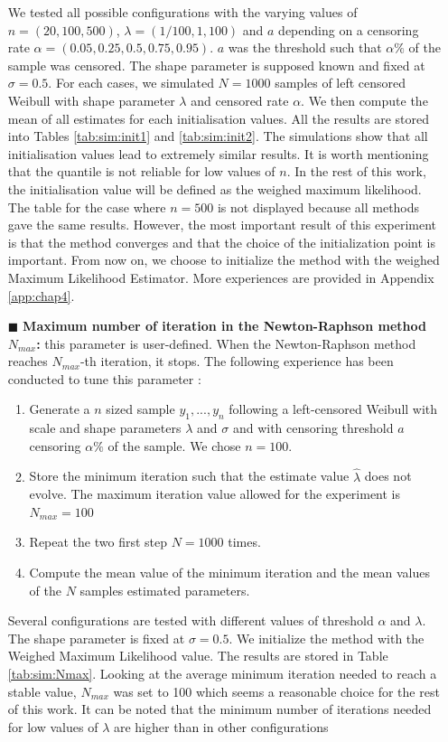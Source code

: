 \begin{itemize}
     We tested all possible configurations with the varying values of $n = (20,100,500)$, $\lambda = (1/100,1,100)$ and $a$ depending on a censoring rate $\alpha = (0.05,0.25,0.5,0.75,0.95)$. $a$ was the threshold such that $\alpha \%$ of the sample was censored. The shape parameter is supposed known and fixed at $\sigma = 0.5$. For each cases, we simulated $N = 1000$ samples of left censored Weibull with shape parameter $\lambda$ and censored rate $\alpha$. We then compute the mean of all estimates for each initialisation values. All the results are stored into Tables \ref{tab:sim:init1} and \ref{tab:sim:init2}. The simulations show that all initialisation values lead to extremely similar results. It is worth mentioning that the quantile is not reliable for low values of $n$. In the rest of this work, the initialisation value will be defined as the weighed maximum likelihood. The table for the case where $n = 500$ is not displayed because all methods gave the same results. However, the most important result of this experiment is that the method converges and that the choice of the initialization point is important. From now on, we choose to initialize the method with the weighed Maximum Likelihood Estimator. More experiences are provided in Appendix \ref{app:chap4}.
     \item[$\blacksquare$] \textbf{Maximum number of iteration in the Newton-Raphson method $N_{max}$:} this parameter is user-defined. When the Newton-Raphson method reaches $N_{max}$-th iteration, it stops. The following experience has been conducted to tune this parameter : 
    \begin{enumerate}
        \item Generate a $n$ sized sample $y_1,...,y_n$ following a left-censored Weibull with scale and shape parameters $\lambda$ and $\sigma$ and with censoring threshold $a$ censoring $\alpha \%$ of the sample. We chose $n=100$.
        \item Store the minimum iteration such that the estimate value $\hat\lambda$ does not evolve. The maximum iteration value allowed for the experiment is $N_{max} = 100$ 
        \item Repeat the two first step $N = 1000$ times.
        \item Compute the mean value of the minimum iteration and the mean values of the $N$ samples estimated parameters. 
    \end{enumerate}
    Several configurations are tested with different values of threshold $\alpha$ and $\lambda$. The shape parameter is fixed at $\sigma = 0.5$. We initialize the method with the Weighed Maximum Likelihood value. The results are stored in Table \ref{tab:sim:Nmax}. Looking at the average minimum iteration needed to reach a stable value, $N_{max}$ was set to 100 which seems a reasonable choice for the rest of this work. It can be noted that the minimum number of iterations needed for low values of $\lambda$ are higher than in other configurations  
\end{itemize}

